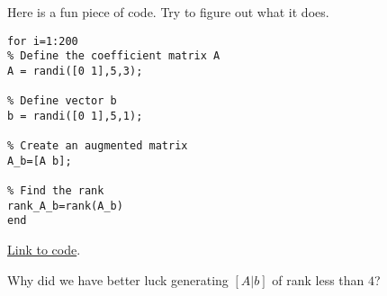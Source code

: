 \documentclass{ximera}
\begin{document}
\begin{problem}
Here is a fun piece of code.  Try to figure out what it does.

\begin{verbatim}
for i=1:200
% Define the coefficient matrix A
A = randi([0 1],5,3);

% Define vector b
b = randi([0 1],5,1);

% Create an augmented matrix
A_b=[A b];

% Find the rank
rank_A_b=rank(A_b)
end
\end{verbatim}

\href{https://sagecell.sagemath.org/?z=eJxljssKwjAQRfeB-YfZCC10kShulC6C4k-UUvKY6CBNIUTx802kguBmuItz75mwJOReHbZSgtjgmQJHwnwjdAuFwI4pZpxNTvxCDUJjj8lEz80gUY3dvtu1RxA_3Se5XEYtCPvHqi97SmQyoYloHte5KMivkqKYbD9otOPKXjj6z0dl6w6i3qkyNTQltCAo-jehYTnK&lang=octave&interacts=eJyLjgUAARUAuQ==}{Link to code}.

Why did we have better luck generating $[A | b]$ of rank less than $4$?
    
\end{problem}
\end{document}

